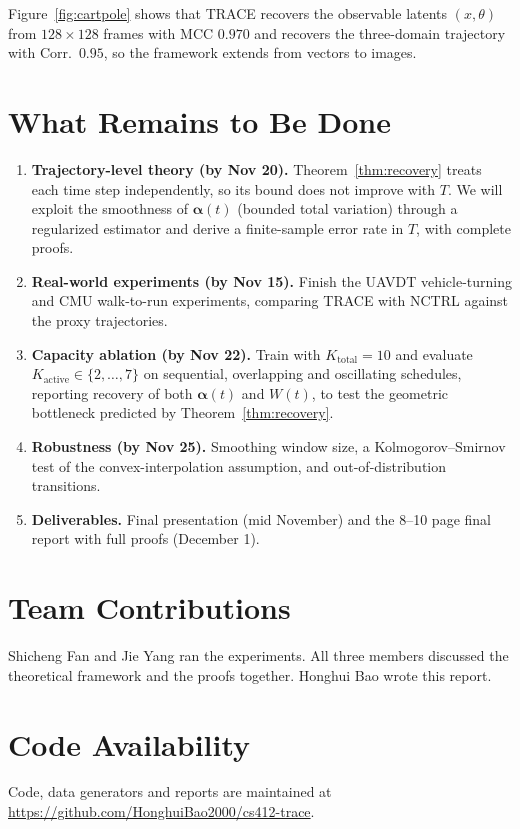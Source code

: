 \documentclass[sigconf,nonacm]{acmart}
\theoremstyle{plain}
\theoremstyle{definition}
\newcommand{\va}{\boldsymbol{\alpha}}
\begin{document}
Figure~\ref{fig:cartpole} shows that TRACE recovers the observable latents $(x,\theta)$ from $128\times128$ frames with MCC $0.970$ and recovers the three-domain trajectory with Corr.\ $0.95$, so the framework extends from vectors to images.

\section{What Remains to Be Done}

\begin{enumerate}
\item \textbf{Trajectory-level theory (by Nov 20).} Theorem~\ref{thm:recovery} treats each time step independently, so its bound does not improve with $T$. We will exploit the smoothness of $\va(t)$ (bounded total variation) through a regularized estimator and derive a finite-sample error rate in $T$, with complete proofs.
\item \textbf{Real-world experiments (by Nov 15).} Finish the UAVDT vehicle-turning and CMU walk-to-run experiments, comparing TRACE with NCTRL against the proxy trajectories.
\item \textbf{Capacity ablation (by Nov 22).} Train with $K_{\text{total}}=10$ and evaluate $K_{\text{active}}\in\{2,\dots,7\}$ on sequential, overlapping and oscillating schedules, reporting recovery of both $\va(t)$ and $W(t)$, to test the geometric bottleneck predicted by Theorem~\ref{thm:recovery}.
\item \textbf{Robustness (by Nov 25).} Smoothing window size, a Kolmogorov--Smirnov test of the convex-interpolation assumption, and out-of-distribution transitions.
\item \textbf{Deliverables.} Final presentation (mid November) and the 8--10 page final report with full proofs (December 1).
\end{enumerate}

\section*{Team Contributions}
Shicheng Fan and Jie Yang ran the experiments. All three members discussed the theoretical framework and the proofs together. Honghui Bao wrote this report.

\section*{Code Availability}
Code, data generators and reports are maintained at \url{https://github.com/HonghuiBao2000/cs412-trace}.



\end{document}
